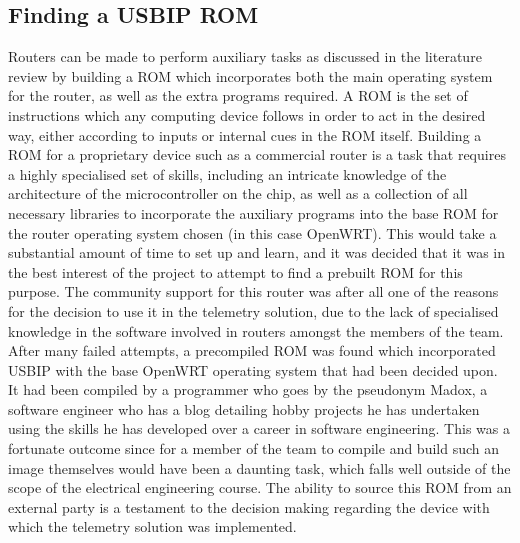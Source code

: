 \subsection{Finding a USBIP ROM}
Routers can be made to perform auxiliary tasks as discussed in the literature review by building a ROM which incorporates both the main operating system for the router, as well as the extra programs required. A ROM is the set of instructions which any computing device follows in order to act in the desired way, either according to inputs or internal cues in the ROM itself. Building a ROM for a proprietary device such as a commercial router is a task that requires a highly specialised set of skills, including an intricate knowledge of the architecture of the microcontroller on the chip, as well as a collection of all necessary libraries to incorporate the auxiliary programs into the base ROM for the router operating system chosen (in this case OpenWRT). This would take a substantial amount of time to set up and learn, and it was decided that it was in the best interest of the project to attempt to find a prebuilt ROM for this purpose. The community support for this router was after all one of the reasons for the decision to use it in the telemetry solution, due to the lack of specialised knowledge in the software involved in routers amongst the members of the team. After many failed attempts, a precompiled ROM was found which incorporated USBIP with the base OpenWRT operating system that had been decided upon\cite{madox_exampleusbip}. It had been compiled by a programmer who goes by the pseudonym Madox, a software engineer who has a blog detailing hobby projects he has undertaken using the skills he has developed over a career in software engineering\cite{madox}. This was a fortunate outcome since for a member of the team to compile and build such an image themselves would have been a daunting task, which falls well outside of the scope of the electrical engineering course. The ability to source this ROM from an external party is a testament to the decision making regarding the device with which the telemetry solution was implemented.



